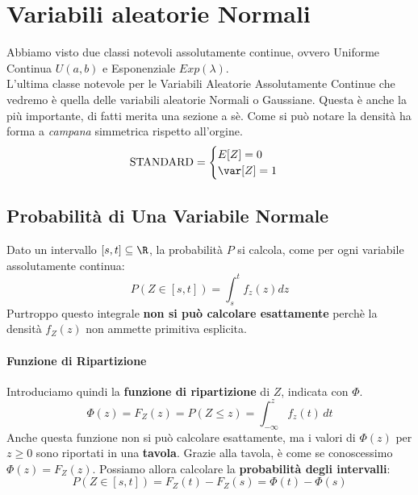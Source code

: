 
	\pagebreak
	\section{Variabili aleatorie Normali}
	Abbiamo visto due classi notevoli assolutamente continue, ovvero Uniforme Continua $U(a,b)$
	e Esponenziale $Exp(\lambda)$.
	\\L'ultima classe notevole per le Variabili Aleatorie Assolutamente Continue che vedremo
	è quella delle variabili aleatorie Normali o Gaussiane. Questa è anche la più importante, di fatti merita una sezione a sè.
	Come si può notare la densità ha forma a \emph{campana} simmetrica rispetto all'orgine.
	\[
		\text{STANDARD} =
		\begin{cases}
			E[Z] = 0 \\
			\var[Z] = 1
		\end{cases}
	\]
	\subsection{Probabilità di Una Variabile Normale}
	Dato un intervallo $[s,t] \subseteq \R$, la probabilità $P$ si calcola,
	come per ogni variabile assolutamente continua:
	\[
		P(Z\in [s,t]) = \int_{s}^{t} f_z(z) dz
	\]
	Purtroppo questo integrale \textbf{non si può calcolare esattamente} perchè
	la densità $f_Z(z)$ non ammette primitiva esplicita.
	\paragraph{Funzione di Ripartizione}
	Introduciamo quindi la \textbf{funzione di ripartizione} di $Z$, indicata con $\Phi$.
	\[
		\Phi(z) = F_Z(z) = P(Z \leq z) = \int_{-\infty}^{z}f_z(t)\,dt
	\]
	Anche questa funzione non si può calcolare esattamente, ma i valori di $\Phi(z)$ per
$z \geq 0$ sono riportati in una \textbf{tavola}.
	Grazie alla tavola, è come se conoscessimo $\Phi(z) = F_Z(z)$.
	Possiamo allora calcolare la \textbf{probabilità degli intervalli}:
	\[
		P(Z\in [s,t]) = F_Z(t) - F_Z(s) = \Phi(t) - \Phi(s)
	\]


